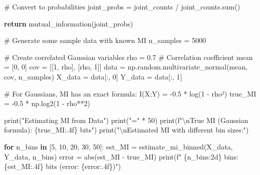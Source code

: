 \documentclass[
  11pt,
  letterpaper,
  oneside,
  openany]{book}
\newenvironment{Shaded}{\begin{snugshade}}{\end{snugshade}}
\newcommand{\BuiltInTok}[1]{\textcolor[rgb]{0.00,0.23,0.31}{#1}}
\newcommand{\CharTok}[1]{\textcolor[rgb]{0.13,0.47,0.30}{#1}}
\newcommand{\CommentTok}[1]{\textcolor[rgb]{0.37,0.37,0.37}{#1}}
\newcommand{\ControlFlowTok}[1]{\textcolor[rgb]{0.00,0.23,0.31}{\textbf{#1}}}
\newcommand{\DecValTok}[1]{\textcolor[rgb]{0.68,0.00,0.00}{#1}}
\newcommand{\FloatTok}[1]{\textcolor[rgb]{0.68,0.00,0.00}{#1}}
\newcommand{\KeywordTok}[1]{\textcolor[rgb]{0.00,0.23,0.31}{\textbf{#1}}}
\newcommand{\NormalTok}[1]{\textcolor[rgb]{0.00,0.23,0.31}{#1}}
\newcommand{\OperatorTok}[1]{\textcolor[rgb]{0.37,0.37,0.37}{#1}}
\newcommand{\SpecialCharTok}[1]{\textcolor[rgb]{0.37,0.37,0.37}{#1}}
\newcommand{\SpecialStringTok}[1]{\textcolor[rgb]{0.13,0.47,0.30}{#1}}
\newcommand{\StringTok}[1]{\textcolor[rgb]{0.13,0.47,0.30}{#1}}
\begin{document}
\begin{Shaded}
\begin{Highlighting}[]
    \CommentTok{\# Convert to probabilities}
\NormalTok{    joint\_probs }\OperatorTok{=}\NormalTok{ joint\_counts }\OperatorTok{/}\NormalTok{ joint\_counts.}\BuiltInTok{sum}\NormalTok{()}
    
    \ControlFlowTok{return}\NormalTok{ mutual\_information(joint\_probs)}


\CommentTok{\# Generate some sample data with known MI}
\NormalTok{n\_samples }\OperatorTok{=} \DecValTok{5000}

\CommentTok{\# Create correlated Gaussian variables}
\NormalTok{rho }\OperatorTok{=} \FloatTok{0.7}  \CommentTok{\# Correlation coefficient}
\NormalTok{mean }\OperatorTok{=}\NormalTok{ [}\DecValTok{0}\NormalTok{, }\DecValTok{0}\NormalTok{]}
\NormalTok{cov }\OperatorTok{=}\NormalTok{ [[}\DecValTok{1}\NormalTok{, rho], [rho, }\DecValTok{1}\NormalTok{]]}
\NormalTok{data }\OperatorTok{=}\NormalTok{ np.random.multivariate\_normal(mean, cov, n\_samples)}
\NormalTok{X\_data }\OperatorTok{=}\NormalTok{ data[:, }\DecValTok{0}\NormalTok{]}
\NormalTok{Y\_data }\OperatorTok{=}\NormalTok{ data[:, }\DecValTok{1}\NormalTok{]}

\CommentTok{\# For Gaussians, MI has an exact formula: I(X;Y) = {-}0.5 * log(1 {-} rho²)}
\NormalTok{true\_MI }\OperatorTok{=} \OperatorTok{{-}}\FloatTok{0.5} \OperatorTok{*}\NormalTok{ np.log2(}\DecValTok{1} \OperatorTok{{-}}\NormalTok{ rho}\OperatorTok{**}\DecValTok{2}\NormalTok{)}

\BuiltInTok{print}\NormalTok{(}\StringTok{"Estimating MI from Data"}\NormalTok{)}
\BuiltInTok{print}\NormalTok{(}\StringTok{"="} \OperatorTok{*} \DecValTok{50}\NormalTok{)}
\BuiltInTok{print}\NormalTok{(}\SpecialStringTok{f"}\CharTok{\textbackslash{}n}\SpecialStringTok{True MI (Gaussian formula): }\SpecialCharTok{\{}\NormalTok{true\_MI}\SpecialCharTok{:.4f\}}\SpecialStringTok{ bits"}\NormalTok{)}
\BuiltInTok{print}\NormalTok{(}\StringTok{"}\CharTok{\textbackslash{}n}\StringTok{Estimated MI with different bin sizes:"}\NormalTok{)}

\ControlFlowTok{for}\NormalTok{ n\_bins }\KeywordTok{in}\NormalTok{ [}\DecValTok{5}\NormalTok{, }\DecValTok{10}\NormalTok{, }\DecValTok{20}\NormalTok{, }\DecValTok{30}\NormalTok{, }\DecValTok{50}\NormalTok{]:}
\NormalTok{    est\_MI }\OperatorTok{=}\NormalTok{ estimate\_mi\_binned(X\_data, Y\_data, n\_bins)}
\NormalTok{    error }\OperatorTok{=} \BuiltInTok{abs}\NormalTok{(est\_MI }\OperatorTok{{-}}\NormalTok{ true\_MI)}
    \BuiltInTok{print}\NormalTok{(}\SpecialStringTok{f"  }\SpecialCharTok{\{}\NormalTok{n\_bins}\SpecialCharTok{:2d\}}\SpecialStringTok{ bins: }\SpecialCharTok{\{}\NormalTok{est\_MI}\SpecialCharTok{:.4f\}}\SpecialStringTok{ bits (error: }\SpecialCharTok{\{}\NormalTok{error}\SpecialCharTok{:.4f\}}\SpecialStringTok{)"}\NormalTok{)}


\end{Highlighting}
\end{Shaded}
\end{document}
